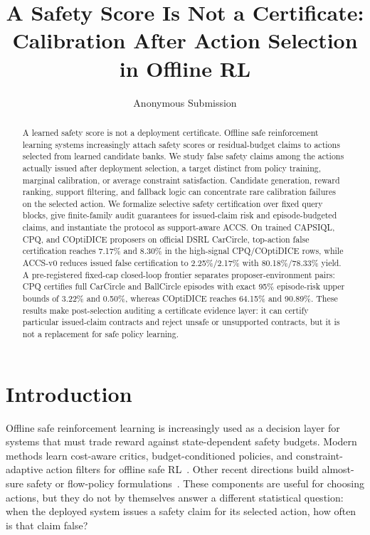 \documentclass[letterpaper]{article}
\title{A Safety Score Is Not a Certificate: Calibration After Action Selection in Offline RL}
\author{
    Anonymous Submission
}
\begin{document}
\maketitle

\begin{abstract}
A learned safety score is not a deployment certificate. Offline safe
reinforcement learning systems increasingly attach safety scores or
residual-budget claims to actions selected from learned candidate banks. We
study false safety claims among the actions actually issued after deployment
selection, a target distinct from policy training, marginal calibration, or
average constraint satisfaction. Candidate generation, reward ranking, support
filtering, and fallback logic can concentrate rare calibration failures on the
selected action. We formalize selective safety certification over fixed query
blocks, give finite-family audit guarantees for issued-claim risk and
episode-budgeted claims, and instantiate the protocol as support-aware ACCS.
On trained CAPSIQL, CPQ, and COptiDICE proposers on official DSRL CarCircle,
top-action false certification reaches 7.17\% and 8.30\% in the high-signal
CPQ/COptiDICE rows, while ACCS-v0 reduces issued false certification to
2.25\%/2.17\% with 80.18\%/78.33\% yield. A pre-registered fixed-cap
closed-loop frontier separates proposer-environment pairs: CPQ certifies full
CarCircle and BallCircle episodes with exact 95\% episode-risk upper bounds of
3.22\% and 0.50\%, whereas COptiDICE reaches 64.15\% and 90.89\%. These
results make post-selection auditing a certificate evidence layer: it can
certify particular issued-claim contracts and reject unsafe or unsupported
contracts, but it is not a replacement for safe policy learning.
\end{abstract}

\section{Introduction}

Offline safe reinforcement learning is increasingly used as a decision layer
for systems that must trade reward against state-dependent safety budgets.
Modern methods learn cost-aware critics, budget-conditioned policies, and
constraint-adaptive action filters for offline safe RL~\cite{li2025caps,wang2026bcrl}.
Other recent directions build almost-sure safety or flow-policy
formulations~\cite{aegis2026,tayal2026safefql}. These components are useful for
choosing actions, but they do not by themselves answer a different statistical
question: when the deployed system issues a safety claim for its selected
action, how often is that claim false?
\end{document}
